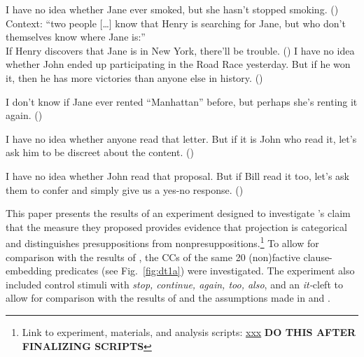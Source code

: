 \documentclass[11pt,fleqn]{article}
\def\infelic{{\leavevmode\llap{\#}}}
\newcommand{\6}{\mbox{$[\hspace*{-.6mm}[$}}
\newcommand{\9}{\mbox{$]\hspace*{-.6mm}]$}}
\newcommand{\citepos}[1]{\citeauthor{#1}'s \citeyear{#1}}
\begin{document}
\begin{exe}
\ex\label{eic2}
\begin{xlist}
\ex I have no idea whether Jane ever smoked, but she hasn't stopped smoking. \hfill (\citealt[443]{simons01})
\ex Context: ``two people [\ldots] know that Henry is searching for Jane, but who don't themselves know where Jane is:'' \\ If Henry discovers that Jane is in New York, there'll be trouble. \hfill (\citealt[434]{simons01})
\ex I have no idea whether John ended up participating in the
Road Race yesterday. But if he won it, then he has more victories than anyone else in history. \hfill (\citealt[39]{abusch10})
\end{xlist}
\ex\label{eic3}
\begin{xlist}
\ex\infelic I don't know if Jane ever rented ``Manhattan'' before, but perhaps she's renting it again. \hfill (\citealt[443]{simons01})

\ex \infelic I have no idea whether anyone read that letter. But if it is John
who read it, let's ask him to be discreet about the content. \hfill (\citealt[40]{abusch10})

\ex \infelic I have no idea whether John read that proposal. But if Bill read it too, let's ask them to confer and simply give us a yes-no response. \hfill (\citealt[40]{abusch10})
\end{xlist}
\end{exe}

This paper presents the results of an experiment designed to investigate \citepos{mandelkern-etal2020} claim that the measure they proposed provides evidence that projection is categorical and distinguishes presuppositions from nonpresuppositions.\footnote{Link to experiment, materials, and analysis scripts: \url{xxx} {\bf DO THIS AFTER FINALIZING SCRIPTS}}  To allow for comparison with the results of \citealt{degen-tonhauser-language}, the CCs of the same 20 (non)factive clause-embedding predicates (see Fig.~\ref{fig:dt1a}) were investigated. The experiment also included control stimuli with {\em stop, continue, again, too, also}, and an {\em it-}cleft to allow for comparison with the results of \citealt{mandelkern-etal2020} and the assumptions made in \citealt{simons01} and \citealt{abusch10}. 
\end{document}
